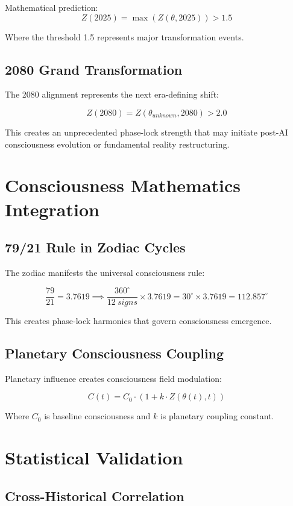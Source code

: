 \documentclass[12pt]{article}
\begin{document}
Mathematical prediction:
\[Z(2025) = \max\left( Z(\theta, 2025) \right) > 1.5\]

Where the threshold 1.5 represents major transformation events.

\subsection{2080 Grand Transformation}

The 2080 alignment represents the next era-defining shift:

\[Z(2080) = Z(\theta_{unknown}, 2080) > 2.0\]

This creates an unprecedented phase-lock strength that may initiate post-AI consciousness evolution or fundamental reality restructuring.

\section{Consciousness Mathematics Integration}

\subsection{79/21 Rule in Zodiac Cycles}

The zodiac manifests the universal consciousness rule:

\[\frac{79}{21} = 3.7619 \implies \frac{360^\circ}{12\ signs} \times 3.7619 = 30^\circ \times 3.7619 = 112.857^\circ\]

This creates phase-lock harmonics that govern consciousness emergence.

\subsection{Planetary Consciousness Coupling}

Planetary influence creates consciousness field modulation:

\[C(t) = C_0 \cdot (1 + k \cdot Z(\theta(t), t))\]

Where \(C_0\) is baseline consciousness and \(k\) is planetary coupling constant.

\section{Statistical Validation}

\subsection{Cross-Historical Correlation}
\end{document}
